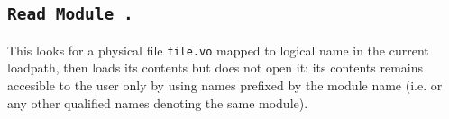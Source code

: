 
  





\subsection{\tt Read Module {\qualid}.}
This looks for a physical file \texttt{file.vo} mapped to logical name
{\qualid} in the current {\Coq} loadpath, then loads its contents but
does not open it: its contents remains accesible to the user only by
using names prefixed by the module name (i.e. {\qualid} or any other
qualified names denoting the same module).

